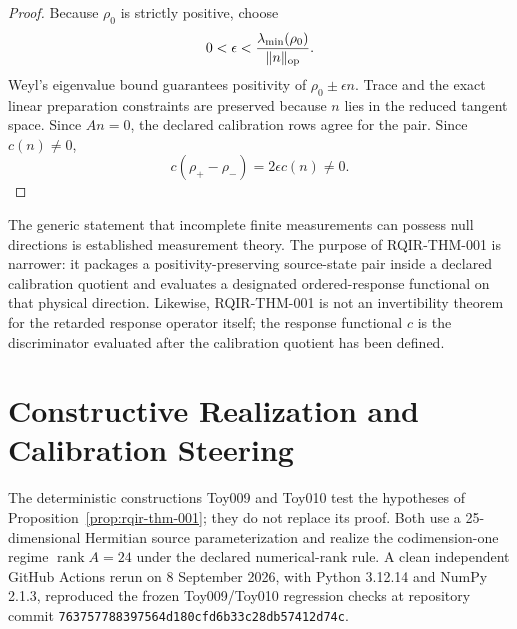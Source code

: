 \documentclass[11pt]{article}
\begin{document}
\begin{proof}
Because $\rho_0$ is strictly positive, choose
\begin{equation}
 0<\epsilon<\frac{\lambda_{\min}(\rho_0)}{\lVert n\rVert_{\rm op}}.
\end{equation}
Weyl's eigenvalue bound guarantees positivity of $\rho_0\pm\epsilon n$. Trace and the exact linear preparation constraints are preserved because $n$ lies in the reduced tangent space. Since $An=0$, the declared calibration rows agree for the pair. Since $c(n)\neq0$,
\begin{equation}
 c(\rho_+-\rho_-)=2\epsilon c(n)\neq0.
\end{equation}
\end{proof}

The generic statement that incomplete finite measurements can possess null directions is established measurement theory. The purpose of RQIR-THM-001 is narrower: it packages a positivity-preserving source-state pair inside a declared calibration quotient and evaluates a designated ordered-response functional on that physical direction. Likewise, RQIR-THM-001 is not an invertibility theorem for the retarded response operator itself; the response functional $c$ is the discriminator evaluated after the calibration quotient has been defined.

\section{Constructive Realization and Calibration Steering}

The deterministic constructions Toy009 and Toy010 test the hypotheses of Proposition~\ref{prop:rqir-thm-001}; they do not replace its proof. Both use a 25-dimensional Hermitian source parameterization and realize the codimension-one regime $\operatorname{rank}A=24$ under the declared numerical-rank rule. A clean independent GitHub Actions rerun on 8 September 2026, with Python 3.12.14 and NumPy 2.1.3, reproduced the frozen Toy009/Toy010 regression checks at repository commit \texttt{763757788397564d180cfd6b33c28db57412d74c}.
\end{document}
